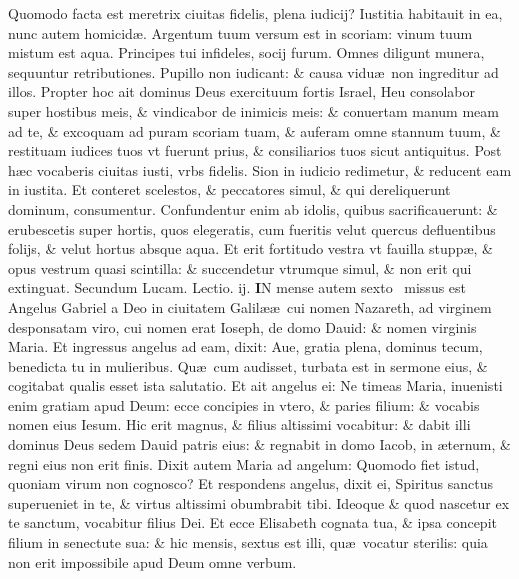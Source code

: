 \documentclass[a5paper,10pt]{book}
\def\rightmarginnote{%
	\lrmarginnote{\hskip\columnwidth \hskip -1em}}
\def\ae{æ}
\begin{document}
\begin{multicols*}{2}
Quomodo facta est meretrix ciuitas fidelis, plena iudicij?
Iustitia habitauit in ea, nunc autem homicid\ae .
Argentum tuum versum est in scoriam: vinum tuum mistum est aqua.
Principes tui infideles, socij furum.
Omnes diligunt munera, sequuntur retributiones.
Pupillo non iudicant: \& causa vidu\ae \ non ingreditur ad illos.
Propter hoc ait dominus Deus exercituum fortis Israel, Heu consolabor super hostibus meis, \& vindicabor de inimicis meis: \& conuertam manum meam ad te, \& excoquam ad puram scoriam tuam, \& auferam omne stannum tuum, \& restituam iudices tuos vt fuerunt prius, \& consiliarios tuos sicut antiquitus.
Post h\ae c vocaberis ciuitas iusti, vrbs fidelis.
Sion in iudicio redimetur, \& reducent eam in iustita.
Et conteret scelestos, \& peccatores simul, \& qui dereliquerunt dominum, consumentur.
Confundentur enim ab idolis, quibus sacrificauerunt: \& erubescetis super hortis, quos elegeratis, cum fueritis velut quercus defluentibus folijs, \& velut hortus absque aqua.
Et erit fortitudo vestra vt fauilla stupp\ae , \& opus vestrum quasi scintilla: \& succendetur vtrumque simul, \& non erit qui extinguat.
\color{red} Secundum Lucam. Lectio. ij.\color{black}
\vspace{-.25em}
\lettrine[lines=2]{\bfseries \color{red} I}{}N\rightmarginnote{ca. 1.\\C} mense autem sexto \textdagger \ missus est Angelus Gabriel a Deo in ciuitatem Galil\ae \ae \ cui nomen Nazareth, ad virginem desponsatam viro, cui nomen erat Ioseph, de domo Dauid: \& nomen virginis Maria.
Et ingressus angelus ad eam, dixit: Aue, gratia plena, dominus tecum, benedicta tu in mulieribus.
Qu\ae \ cum audisset, 
turbata est in sermone eius, \& cogitabat qualis esset ista salutatio.
Et ait angelus ei: Ne timeas Maria, inuenisti enim gratiam apud Deum: ecce concipies in vtero, \& paries filium: \& vocabis nomen eius Iesum.
Hic erit magnus, \& filius altissimi vocabitur: \& dabit illi dominus Deus sedem Dauid patris eius: \& regnabit in domo Iacob, in \ae ternum, \& regni eius non erit finis.
Dixit autem Maria ad angelum: Quomodo fiet istud, quoniam virum non cognosco?
Et respondens angelus, dixit ei, Spiritus sanctus superueniet in te, \& virtus altissimi obumbrabit tibi.
Ideoque \& quod nascetur ex te sanctum, vocabitur filius Dei.
Et ecce Elisabeth cognata tua, \& ipsa concepit filium in senectute sua: \& hic mensis, sextus est illi, qu\ae \ vocatur sterilis: quia non erit impossibile apud Deum omne verbum.

\end{multicols*}
\end{document}
